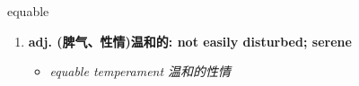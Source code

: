 
\begin{frame}
{\huge equable}
\begin{center}
\begin{enumerate}\Large
  \item \textbf{adj. (脾气、性情)温和的: not easily disturbed; serene}
  \begin{itemize}
    \item \em{\Large{equable temperament 温和的性情}}
  \end{itemize}
\end{enumerate}
\end{center}
\end{frame}
